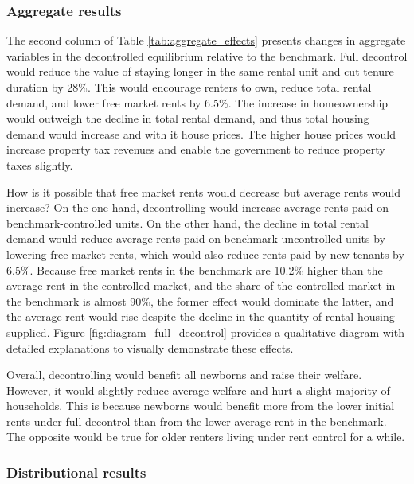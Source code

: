 \documentclass[parskip=full]{article}
\begin{document}
\subsubsection{Aggregate results} The second column of Table \ref{tab:aggregate_effects} presents changes in aggregate variables in the decontrolled equilibrium relative to the benchmark. Full decontrol would reduce the value of staying longer in the same rental unit and cut tenure duration by 28\%. This would encourage renters to own, reduce total rental demand, and lower free market rents by 6.5\%. The increase in homeownership would outweigh the decline in total rental demand, and thus total housing demand would increase and with it house prices. The higher house prices would increase property tax revenues and enable the government to reduce property taxes slightly.

How is it possible that free market rents would decrease but average rents would increase? On the one hand, decontrolling would increase average rents paid on benchmark-controlled units. On the other hand, the decline in total rental demand would reduce average rents paid on benchmark-uncontrolled units by lowering free market rents, which would also reduce rents paid by new tenants by 6.5\%. Because free market rents in the benchmark are 10.2\% higher than the average rent in the controlled market, and the share of the controlled market in the benchmark is almost 90\%, the former effect would dominate the latter, and the average rent would rise despite the decline in the quantity of rental housing supplied. Figure \ref{fig:diagram_full_decontrol} provides a qualitative diagram with detailed explanations to visually demonstrate these effects. %

Overall, decontrolling would benefit all newborns and raise their welfare. However, it would slightly reduce average welfare and hurt a slight majority of households. This is because newborns would benefit more from the lower initial rents under full decontrol than from the lower average rent in the benchmark. The opposite would be true for older renters living under rent control for a while. 

\subsubsection{Distributional results} 
\end{document}
